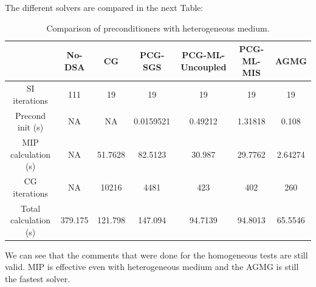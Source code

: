 The different solvers are compared in the next Table:
\begin{table}[H]
\begin{center}
\begin{tabular}{|c|c|c|c|c|c|c|}
\hline
 & No-DSA & CG & PCG-SGS & PCG-ML-Uncoupled & PCG-ML-MIS & AGMG\\
\hline
        SI iterations & 111     & 19      & 19        & 19      & 19      & 19 \\
     Precond init (s) & NA      & NA      & 0.0159521 & 0.49212 & 1.31818 &
0.108 \\
  MIP calculation (s) & NA      & 51.7628 & 82.5123   & 30.987  & 29.7762 &
2.64274 \\
        CG iterations & NA      & 10216   & 4481      & 423     & 402     & 260 \\
Total calculation (s) & 379.175 & 121.798 & 147.094   & 94.7139 & 94.8013 &
65.5546 \\
\hline
\end{tabular}
\caption{Comparison of preconditioners with heterogeneous medium.}
\end{center}
\end{table}
We can see that the comments that were done for the homogeneous tests are
still valid. MIP is effective even with heterogeneous medium and the AGMG is
still the fastest solver.
